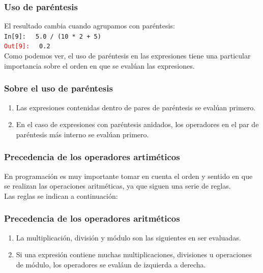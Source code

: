 \documentclass[12pt]{beamer}
\begin{document}
\begin{frame}[fragile]
\frametitle{Uso de paréntesis}
El resultado cambia cuando agrupamos con paréntesis:
\\
\bigskip
\textcolor{ao}{\texttt{In[9]: }} \verb| 5.0 / (10 * 2 + 5)| \\
\pause
\textcolor{red}{\texttt{Out[9]: }} \verb| 0.2|
\pause
\\
\bigskip
Como podemos ver, el uso de paréntesis en las expresiones tiene una particular importancia sobre el orden en que se evalúan las expresiones.
\end{frame}
\begin{frame}
\frametitle{Sobre el uso de paréntesis}
\begin{enumerate}[<+->]
\item Las expresiones contenidas dentro de pares de paréntesis se evalúan primero.
\item En el caso de expresiones con paréntesis anidados, los operadores en el par de paréntesis más interno se evalúan primero.
\end{enumerate}
\end{frame}
\begin{frame}
\frametitle{Precedencia de los operadores artiméticos}
En programación es muy importante tomar en cuenta el orden y sentido en que se realizan las operaciones aritméticas, ya que siguen una serie de reglas.
\\
\bigskip
\pause
Las reglas se indican a continuación:
\end{frame}
\begin{frame}
\frametitle{Precedencia de los operadores aritméticos}
\begin{enumerate}[<+->]
\item La multiplicación, división y módulo son las siguientes en ser evaluadas. 
\item Si una expresión contiene muchas multiplicaciones, divisiones u operaciones de módulo, los operadores se evaláun de izquierda a derecha.
\seti
\end{enumerate}
\end{frame}
\end{document}
